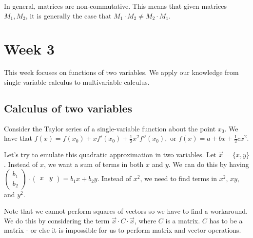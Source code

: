\documentclass[a4paper, 12pt,oneside,openany]{book}
\begin{document}
In general, matrices are non-commutative. This means that given matrices $M_1, M_2$, it is generally the case that $M_1 \cdot M_2 \neq M_2 \cdot M_1$.





\chapter{Week 3}

This week focuses on functions of two variables. We apply our knowledge from single-variable calculus to multivariable calculus.

\section{Calculus of two variables}

Consider the Taylor series of a single-variable function about the point $x_0$. We have that $f(x) = f(x_0)+xf'(x_0)+\frac{1}{2}x^2 f''(x_0),$ or $f(x)=a+bx+\frac{1}{2}cx^2$. 

Let's try to emulate this quadratic approximation in two variables. Let $\vec{x} = \{x, y\}$. Instead of $x$, we want a sum of terms in both $x$ and $y$. We can do this by having $\begin{pmatrix} b_1 \\ b_2 \end{pmatrix} \cdot \begin{pmatrix} x & y \end{pmatrix} = b_1x+b_2y$. Instead of $x^2$, we need to find terms in $x^2$, $xy$, and $y^2$.

Note that we cannot perform squares of vectors so we have to find a workaround. We do this by considering the term $\vec{x} \cdot C \cdot \vec{x}$, where $C$ is a matrix. $C$ has to be a matrix - or else it is impossible for us to perform matrix and vector operations.
\end{document}
